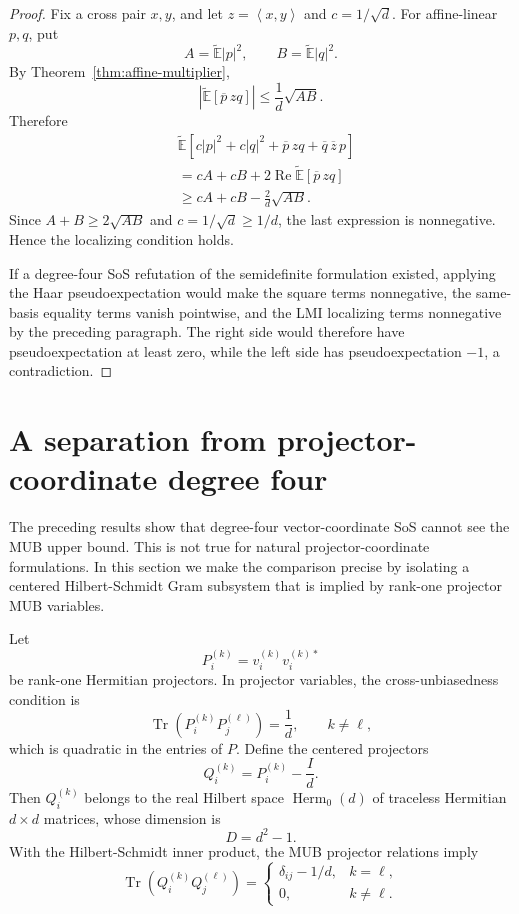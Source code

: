 \documentclass[11pt]{article}
\theoremstyle{remark}
\newcommand{\Et}{\widetilde{\mathbb{E}}}
\newcommand{\ip}[2]{\left\langle #1,#2\right\rangle}
\newcommand{\Tr}{\operatorname{Tr}}
\newcommand{\Herm}{\operatorname{Herm}}
\begin{document}
\begin{proof}
Fix a cross pair $x,y$, and let $z=\ip{x}{y}$ and $c=1/\sqrt d$. For affine-linear $p,q$, put
\[
A=\Et|p|^2,
\qquad
B=\Et|q|^2.
\]
By Theorem~\ref{thm:affine-multiplier},
\[
\left|\Et[\overline p\,zq]\right|
\le
\frac1d\sqrt{AB}.
\]
Therefore
\[
\begin{aligned}
&\Et\left[
c|p|^2+c|q|^2+\overline p\,zq+\overline q\,\overline z\,p
\right]\\
&=cA+cB+2\operatorname{Re}\Et[\overline p\,zq]\\
&\ge cA+cB-\frac2d\sqrt{AB}.
\end{aligned}
\]
Since $A+B\ge2\sqrt{AB}$ and $c=1/\sqrt d\ge1/d$, the last expression is nonnegative. Hence the localizing condition holds.

If a degree-four SoS refutation of the semidefinite formulation existed, applying the Haar pseudoexpectation would make the square terms nonnegative, the same-basis equality terms vanish pointwise, and the LMI localizing terms nonnegative by the preceding paragraph. The right side would therefore have pseudoexpectation at least zero, while the left side has pseudoexpectation $-1$, a contradiction.
\end{proof}


\section{A separation from projector-coordinate degree four}

The preceding results show that degree-four vector-coordinate SoS cannot see the MUB upper bound. This is not true for natural projector-coordinate formulations. In this section we make the comparison precise by isolating a centered Hilbert-Schmidt Gram subsystem that is implied by rank-one projector MUB variables.

Let
\[
P_i^{(k)}=v_i^{(k)}v_i^{(k)*}
\]
be rank-one Hermitian projectors. In projector variables, the cross-unbiasedness condition is
\[
\Tr(P_i^{(k)}P_j^{(\ell)})=\frac1d,
\qquad k\ne\ell,
\]
which is quadratic in the entries of $P$. Define the centered projectors
\[
Q_i^{(k)}=P_i^{(k)}-\frac Id.
\]
Then $Q_i^{(k)}$ belongs to the real Hilbert space $\Herm_0(d)$ of traceless Hermitian $d\times d$ matrices, whose dimension is
\[
D=d^2-1.
\]
With the Hilbert-Schmidt inner product, the MUB projector relations imply
\[
\Tr(Q_i^{(k)}Q_j^{(\ell)})=
\begin{cases}
\delta_{ij}-1/d, & k=\ell,\\
0, & k\ne\ell.
\end{cases}
\]
\end{document}
